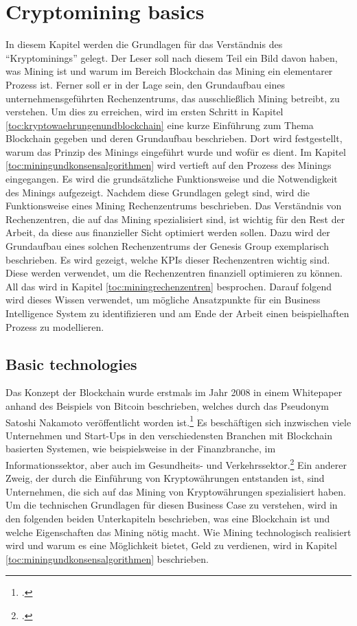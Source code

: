 \newpage
\section{Cryptomining basics} \label{toc:grundlagenkryptomining}


In diesem Kapitel werden die Grundlagen für das Verständnis des "`Kryptominings"' gelegt. Der Leser soll nach diesem Teil
ein Bild davon haben, was Mining ist und warum im Bereich Blockchain das Mining ein elementarer Prozess ist. Ferner soll
er in der Lage sein, den Grundaufbau eines unternehmensgeführten Rechenzentrums, das ausschließlich Mining betreibt, zu
verstehen. Um dies zu erreichen, wird im ersten Schritt in Kapitel \ref{toc:kryptowaehrungenundblockchain} eine kurze
Einführung zum Thema Blockchain gegeben und deren Grundaufbau beschrieben. Dort wird festgestellt, warum das Prinzip des
Minings eingeführt wurde und wofür es dient. Im Kapitel \ref{toc:miningundkonsensalgorithmen} wird vertieft auf den Prozess
des Minings eingegangen. Es wird die grundsätzliche Funktionsweise und die Notwendigkeit des Minings aufgezeigt. Nachdem
diese Grundlagen gelegt sind, wird die Funktionsweise eines Mining Rechenzentrums beschrieben. Das Verständnis von
Rechenzentren, die auf das Mining spezialisiert sind, ist wichtig für den Rest der Arbeit, da diese aus finanzieller
Sicht optimiert werden sollen. Dazu wird der Grundaufbau eines solchen Rechenzentrums der Genesis Group exemplarisch
beschrieben. Es wird gezeigt, welche \acp{KPI} dieser Rechenzentren wichtig sind. Diese werden verwendet, um die
Rechenzentren finanziell optimieren zu können. All das wird in Kapitel \ref{toc:miningrechenzentren} besprochen. Darauf
folgend wird dieses Wissen verwendet, um mögliche Ansatzpunkte für ein Business Intelligence System zu identifizieren
und am Ende der Arbeit einen beispielhaften Prozess zu modellieren.

\subsection{Basic technologies} \label{toc:technologie}

Das Konzept der Blockchain wurde erstmals im Jahr 2008 in einem Whitepaper anhand des Beispiels von Bitcoin beschrieben,
welches durch das Pseudonym Satoshi Nakamoto veröffentlicht worden ist.\footcite[Cf.][]{nakamoto2008bitcoin} Es
beschäftigen sich inzwischen viele Unternehmen und Start-Ups in den verschiedensten Branchen mit Blockchain basierten
Systemen, wie beispielsweise in der Finanzbranche, im Informationssektor, aber auch im Gesundheits- und
Verkehrssektor.\footcite[Cf.][Chap. 4.1]{friedlmaier2018disrupting} Ein anderer Zweig, der durch die Einführung von
Kryptowährungen entstanden ist, sind Unternehmen, die sich auf das Mining von Kryptowährungen spezialisiert haben. Um die
technischen Grundlagen für diesen Business Case zu verstehen, wird in den folgenden beiden Unterkapiteln beschrieben, was
eine Blockchain ist und welche Eigenschaften das Mining nötig macht. Wie Mining technologisch realisiert wird und warum
es eine Möglichkeit bietet, Geld zu verdienen, wird in Kapitel \ref{toc:miningundkonsensalgorithmen} beschrieben.

